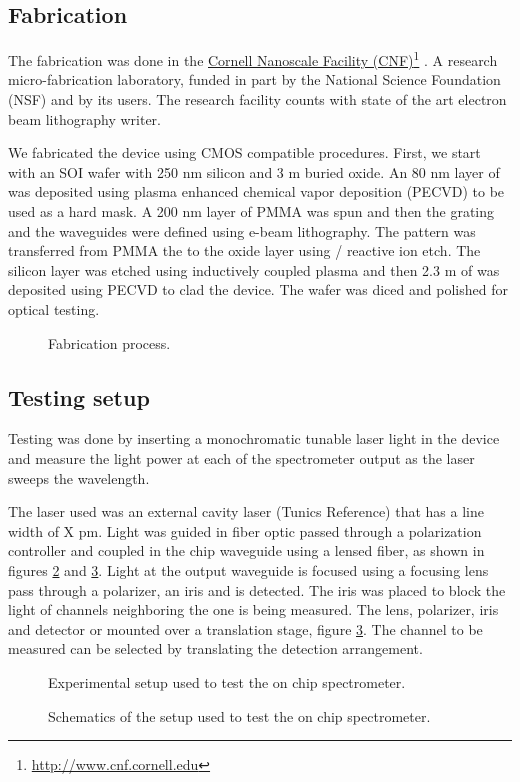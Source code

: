 \documentclass[12pt,twoside,english]{book}
\renewcommand{\~}{\perispomeni}%
\DeclareRobustCommand{\textgreek}[1]{\leavevmode{\greektext #1}}
\numberwithin{equation}{section}
\numberwithin{figure}{section}
\newcommand\fnurl[2]{%
 \href{#2}{#1}\footnote{\url{#2}}%
}
\begin{document}
\subsection{Fabrication}
\label{section:fabrication 1}
The fabrication was done in the \fnurl{Cornell Nanoscale Facility (CNF)}{http://www.cnf.cornell.edu}. A research micro-fabrication laboratory, funded in part by the National Science Foundation (NSF) and by its users. The research facility counts with state of the art electron beam lithography writer.

We fabricated the device using CMOS compatible procedures. First, we start with an SOI wafer with 250 nm silicon and 3 \textgreek{m}m buried oxide. An 80 nm layer of  was deposited using plasma enhanced chemical vapor deposition (PECVD) to be used as a hard mask. A 200 nm layer of PMMA was spun and then the grating and the waveguides were defined using e-beam lithography. The pattern was transferred from PMMA the to the oxide layer using / reactive ion etch. The silicon layer was etched using  inductively coupled plasma and then 2.3 \textgreek{m}m of  was deposited using PECVD to clad the device. The wafer was diced and polished for optical testing.
\begin{figure}[H]
\centering
\caption{Fabrication process.}
\label{fig:fabrication}
\end{figure}

\subsection{Testing setup}
Testing was done by inserting a monochromatic tunable laser light in the device and measure the light power at each of the spectrometer output as the laser sweeps the wavelength.

The laser used was an external cavity laser (Tunics Reference) that has a line width of X pm. Light was guided in  fiber optic passed through a polarization controller and coupled in the chip waveguide using a lensed fiber, as shown in figures \ref{fig:setup photograph} and \ref{fig:setup schematics}. Light at the output waveguide is focused using a focusing lens pass through a polarizer, an iris and is detected. The iris was placed to block the light of channels neighboring the one is being measured. The lens, polarizer, iris and detector or mounted over a translation stage, figure \ref{fig:setup schematics}. The channel to be measured can be selected by translating the detection arrangement.
%
\begin{figure}[h]
\center{}\caption{Experimental setup used to test the on chip spectrometer.}
\label{fig:setup photograph}
\end{figure}
%
\begin{figure}[h]
\center{}\caption{Schematics of the setup used to test the on chip spectrometer.}
\label{fig:setup schematics}
\end{figure}
\end{document}
